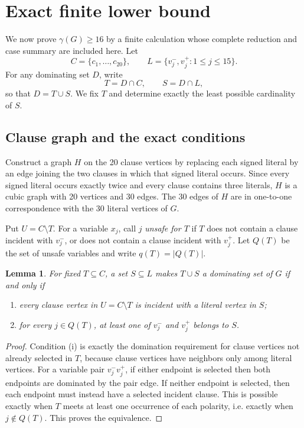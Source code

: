 \documentclass[11pt]{article}
\newtheorem{lemma}[theorem]{Lemma}
\theoremstyle{definition}
\theoremstyle{remark}
\begin{document}
\section{Exact finite lower bound}\label{sec:finite}
We now prove \(\gamma(G)\geq16\) by a finite calculation whose complete reduction and case summary are included here.
Let
\[
C=\{c_1,\ldots,c_{20}\},\qquad L=\{v_j^-,v_j^+:1\leq j\leq15\}.
\]
For any dominating set \(D\), write
\[
T=D\cap C,\qquad S=D\cap L,
\]
so that \(D=T\cup S\).  We fix \(T\) and determine exactly the least possible cardinality of \(S\).

\subsection{Clause graph and the exact conditions}
Construct a graph \(H\) on the 20 clause vertices by replacing each signed literal by an edge joining the two clauses in which that signed literal occurs.  Since every signed literal occurs exactly twice and every clause contains three literals, \(H\) is a cubic graph with 20 vertices and 30 edges.  The 30 edges of \(H\) are in one-to-one correspondence with the 30 literal vertices of \(G\).

Put \(U=C\setminus T\).  For a variable \(x_j\), call \(j\) \emph{unsafe for \(T\)} if \(T\) does not contain a clause incident with \(v_j^-\), or does not contain a clause incident with \(v_j^+\).  Let \(Q(T)\) be the set of unsafe variables and write \(q(T)=|Q(T)|\).

\begin{lemma}\label{lem:fixedT}
For fixed \(T\subseteq C\), a set \(S\subseteq L\) makes \(T\cup S\) a dominating set of \(G\) if and only if
\begin{enumerate}[label=(\roman*)]
\item every clause vertex in \(U=C\setminus T\) is incident with a literal vertex in \(S\);
\item for every \(j\in Q(T)\), at least one of \(v_j^-\) and \(v_j^+\) belongs to \(S\).
\end{enumerate}
\end{lemma}

\begin{proof}
Condition (i) is exactly the domination requirement for clause vertices not already selected in \(T\), because clause vertices have neighbors only among literal vertices.  For a variable pair \(v_j^-v_j^+\), if either endpoint is selected then both endpoints are dominated by the pair edge.  If neither endpoint is selected, then each endpoint must instead have a selected incident clause.  This is possible exactly when \(T\) meets at least one occurrence of each polarity, i.e. exactly when \(j\notin Q(T)\).  This proves the equivalence.
\end{proof}
\end{document}
